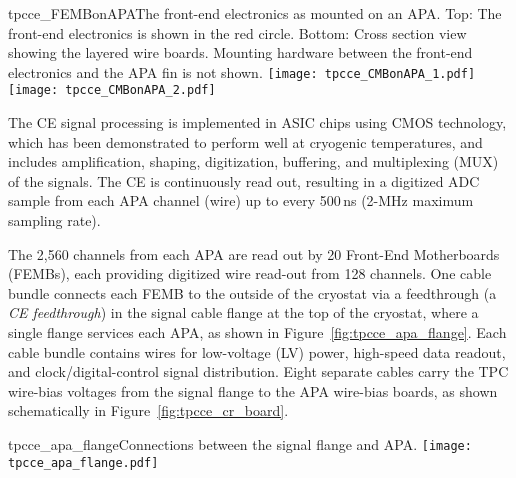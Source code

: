 \begin{cdrfigure}{tpcce_FEMBonAPA}{The 
front-end electronics as mounted on an APA.
  Top: The front-end electronics is shown in the red circle.
 Bottom: Cross section view showing the layered wire boards. Mounting hardware between the front-end electronics 
and the APA fin is not shown.}
\texttt{[image: tpcce\_CMBonAPA\_1.pdf]}
\texttt{[image: tpcce\_CMBonAPA\_2.pdf]}
\end{cdrfigure}

The CE signal processing is implemented in ASIC chips using CMOS technology,
which has been demonstrated to perform well at cryogenic temperatures,
and includes amplification, shaping, digitization, buffering, and multiplexing (MUX) of the signals.
The CE is continuously read out,
resulting in a digitized ADC sample from each APA channel (wire) up to every 500\,ns (2-MHz maximum sampling rate). 

The 2,560 channels from each APA are read out by 20 Front-End Motherboards (FEMBs), each providing 
digitized wire read-out from 128 channels. One cable bundle 
connects each FEMB to the outside of the cryostat via a feedthrough (a \textit{CE feedthrough}) in the signal cable flange at the top of the cryostat, where a single flange services each APA, as shown in Figure~\ref{fig:tpcce_apa_flange}. 
Each cable bundle contains wires for low-voltage (LV) power, high-speed data readout,
and clock/digital-control signal distribution.
Eight separate cables carry the TPC wire-bias voltages from the signal flange to the APA wire-bias boards, as
shown schematically in Figure~\ref{fig:tpcce_cr_board}.

\begin{cdrfigure}{tpcce_apa_flange}{Connections between
the signal flange and APA.}
\texttt{[image: tpcce\_apa\_flange.pdf]}
\end{cdrfigure}

